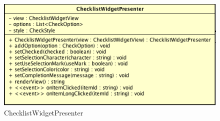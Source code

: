 \label{ChecklistWidgetPresenter}
\begin{figure}[ht]
	\centering
	\includegraphics[scale=0.5]{Sezioni/SottosezioniST/img/ChecklistWidgetPresenter.png}
	\caption{ChecklistWidgetPresenter}
\end{figure}

